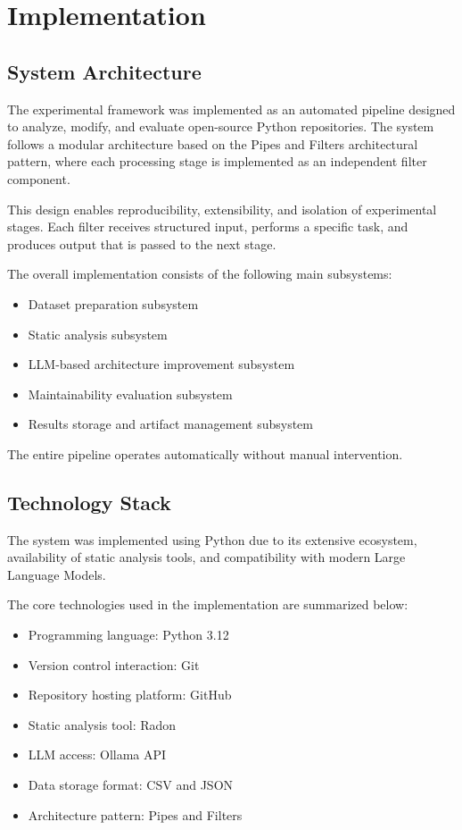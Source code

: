 \chapter{Implementation}

\section{System Architecture}

The experimental framework was implemented as an automated pipeline designed to analyze, modify, and evaluate open-source Python repositories. The system follows a modular architecture based on the Pipes and Filters architectural pattern, where each processing stage is implemented as an independent filter component.

This design enables reproducibility, extensibility, and isolation of experimental stages. Each filter receives structured input, performs a specific task, and produces output that is passed to the next stage.

The overall implementation consists of the following main subsystems:

\begin{itemize}
\item Dataset preparation subsystem
\item Static analysis subsystem
\item LLM-based architecture improvement subsystem
\item Maintainability evaluation subsystem
\item Results storage and artifact management subsystem
\end{itemize}

The entire pipeline operates automatically without manual intervention.

\section{Technology Stack}

The system was implemented using Python due to its extensive ecosystem, availability of static analysis tools, and compatibility with modern Large Language Models.

The core technologies used in the implementation are summarized below:

\begin{itemize}
\item Programming language: Python 3.12
\item Version control interaction: Git
\item Repository hosting platform: GitHub
\item Static analysis tool: Radon
\item LLM access: Ollama API
\item Data storage format: CSV and JSON
\item Architecture pattern: Pipes and Filters
\end{itemize}

